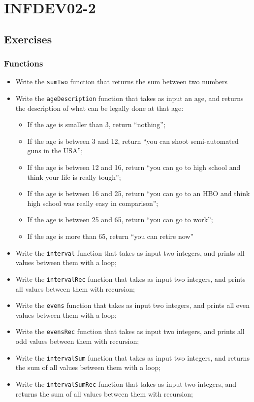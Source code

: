 \setcounter{part}{2}
\part{INFDEV02-2}
\setcounter{chapter}{0}

\chapter{Exercises}
    \section{Functions}
        \begin{itemize}
            \item Write the \texttt{sumTwo} function that returns the sum between two numbers
            \item Write the \texttt{ageDescription} function that takes as input an age, and returns the description of what can be legally done at that age:
            \begin{itemize}
                \item If the age is smaller than 3, return ``nothing'';
                \item If the age is between 3 and 12, return ``you can shoot semi-automated guns in the USA'';
                \item If the age is between 12 and 16, return ``you can go to high school and think your life is really tough'';
                \item If the age is between 16 and 25, return ``you can go to an HBO and think high school was really easy in comparison'';
                \item If the age is between 25 and 65, return ``you can go to work'';
                \item If the age is more than 65, return ``you can retire now''
            \end{itemize}
            \item Write the \texttt{interval} function that takes as input two integers, and prints all values between them with a loop;
            \item Write the \texttt{intervalRec} function that takes as input two integers, and prints all values between them with recursion;
            \item Write the \texttt{evens} function that takes as input two integers, and prints all even values between them with a loop;
            \item Write the \texttt{evensRec} function that takes as input two integers, and prints all odd values between them with recursion;
            \item Write the \texttt{intervalSum} function that takes as input two integers, and returns the sum of all values between them with a loop;
            \item Write the \texttt{intervalSumRec} function that takes as input two integers, and returns the sum of all values between them with recursion;
        \end{itemize}

